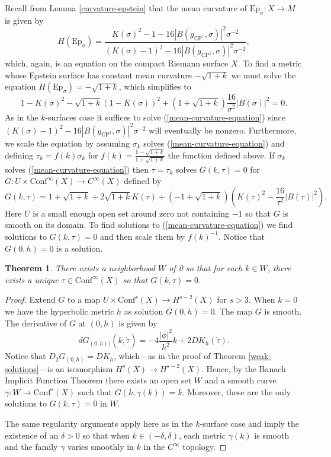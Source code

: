 \documentclass{amsart}
\newcommand{\CP}{\mathbb{C}\mathrm{P}}
\newtheorem{thm}{Theorem}[section]
\begin{document}
Recall from Lemma \ref{curvature-epstein} that the mean curvature of $\mathrm{Ep}_\sigma: X \to M$ is given by 
\[
H(\mathrm{Ep}_\sigma)
= \frac{K(\sigma)^2 - 1 - 16|B(g_{\CP^1},\sigma)|^2\sigma^{-2}}{(K(\sigma) - 1)^2 - 16|B(g_{\CP^1},\sigma)|^2\sigma^{-2}},
\]
which, again, is an equation on the compact Riemann surface $X$.
To find a metric whose Epstein surface has constant mean curvature $-\sqrt{1+k}$ we must solve the equation $H(\mathrm{Ep}_\sigma) = -\sqrt{1+k}$, which simplifies to
\begin{equation}
\label{mean-curvature-equation}
1-K(\sigma)^2 - \sqrt{1+k}(1-K(\sigma))^2 + (1 + \sqrt{1+k})\frac{16}{\sigma^2}|B(\sigma)|^2 = 0.
\end{equation}
As in the $k$-surfaces case it suffices to solve (\ref{mean-curvature-equation}) since $(K(\sigma) - 1)^2 - 16|B(g_{\CP^1},\sigma)|^2\sigma^{-2}$ will eventually be nonzero.
Furthermore, we scale the equation by assuming $\sigma_k$ solves (\ref{mean-curvature-equation}) and defining $\tau_k = f(k) \sigma_k$ for $f(k) = \frac{1-\sqrt{1+k}}{1+\sqrt{1+k}}$ the function defined above. 
If $\sigma_k$ solves (\ref{mean-curvature-equation}) then $\tau = \tau_k$ solves $G(k,\tau) = 0$ for $G: U \times \mathrm{Conf}^\infty(X) \to C^\infty(X)$ defined by 
\[
G(k,\tau) = 1+\sqrt{1+k} + 2\sqrt{1+k}K(\tau) + (-1 + \sqrt{1+k})(K(\tau)^2 - \frac{16}{\tau^2}|B(\tau)|^2).
\]
Here $U$ is a small enough open set around zero not containing $-1$ so that $G$ is smooth on its domain.
To find solutions to (\ref{mean-curvature-equation}) we find solutions to $G(k,\tau) = 0$ and then scale them by $f(k)^{-1}$. 
Notice that $G(0,h) = 0$ is a solution. 

\begin{thm}
There exists a neighborhood $W$ of 0 so that for each $k \in W$, there exists a unique $\tau \in \mathrm{Conf}^\infty(X)$ so that $G(k,\tau) = 0$.
\end{thm}

\begin{proof}
Extend $G$ to a map $U \times \mathrm{Conf}^s(X) \to H^{s-2}(X)$ for $s > 3$. 
When $k = 0$ we have the hyperbolic metric $h$ as solution $G(0,h) = 0$. 
The map $G$ is smooth. 
The derivative of $G$ at $(0,h)$ is given by 
\[
dG_{(0,h))}(\dot{k},\dot{\tau}) = -4 \frac{|\phi|^2}{h^2} \dot{k} + 2 D K_h(\dot{\tau}).
\]
Notice that $D_2 G_{(0,h)} = D K_h$, which---as in the proof of Theorem \ref{weak-solutions}---is an isomorphism $H^s(X) \to H^{s-2}(X)$.
Hence, by the Banach Implicit Function Theorem there exists an open set $W$ and a smooth curve $\gamma: W \to \mathrm{Conf}^{s}(X)$ such that $G(k,\gamma(k)) = k$. 
Moreover, these are the only solutions to $G(k,\tau) = 0$ in $W$.

The same regularity arguments apply here as in the $k$-surface case and imply the existence of an $\delta > 0$ so that when $k \in (-\delta,\delta)$, each metric $\gamma(k)$ is smooth and the family $\gamma$ varies smoothly in $k$ in the $C^\infty$ topology. 
\end{proof}
\end{document}
